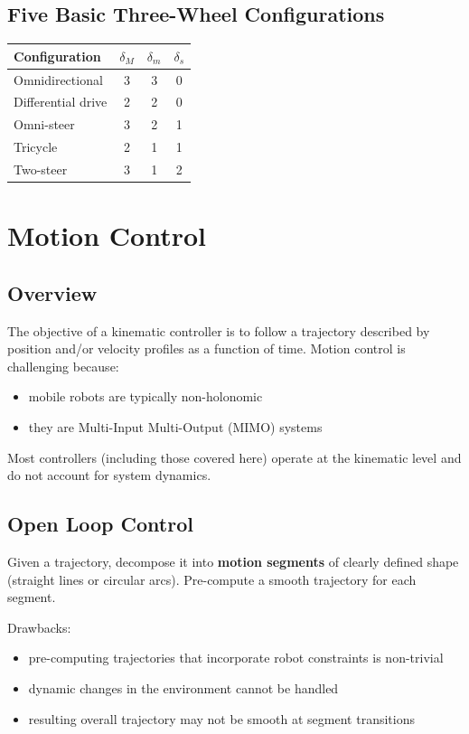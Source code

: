 \documentclass[11pt,a4paper]{article}
\theoremstyle{definition}
\theoremstyle{plain}
\theoremstyle{remark}
\begin{document}
\subsection{Five Basic Three-Wheel Configurations}

\begin{center}
\begin{tabular}{lccc}
\hline
Configuration & $\delta_M$ & $\delta_m$ & $\delta_s$ \\
\hline
Omnidirectional & 3 & 3 & 0 \\
Differential drive & 2 & 2 & 0 \\
Omni-steer & 3 & 2 & 1 \\
Tricycle & 2 & 1 & 1 \\
Two-steer & 3 & 1 & 2 \\
\hline
\end{tabular}
\end{center}

\section{Motion Control}

\subsection{Overview}

The objective of a kinematic controller is to follow a trajectory described by position and/or velocity profiles as a function of time. Motion control is challenging because:
\begin{itemize}
    \item mobile robots are typically non-holonomic
    \item they are Multi-Input Multi-Output (MIMO) systems
\end{itemize}
Most controllers (including those covered here) operate at the kinematic level and do not account for system dynamics.

\subsection{Open Loop Control}

Given a trajectory, decompose it into \textbf{motion segments} of clearly defined shape (straight lines or circular arcs). Pre-compute a smooth trajectory for each segment.

Drawbacks:
\begin{itemize}
    \item pre-computing trajectories that incorporate robot constraints is non-trivial
    \item dynamic changes in the environment cannot be handled
    \item resulting overall trajectory may not be smooth at segment transitions
\end{itemize}
\end{document}
